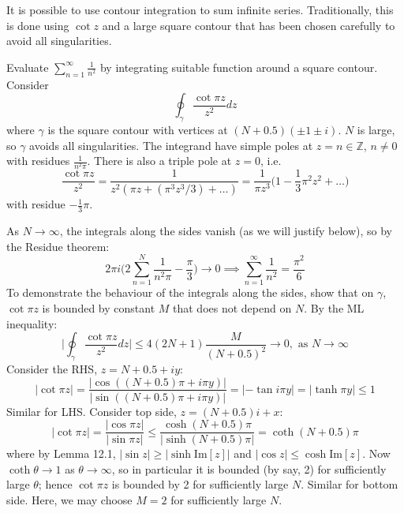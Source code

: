 \documentclass[a4paper]{article}
\begin{document}
It is possible to use contour integration to sum infinite series. Traditionally, this is done using $\cot z$ and a large square contour that has been chosen carefully to avoid all singularities. 
\begin{eg}
Evaluate $\sum_{n=1}^\infty\frac{1}{n^2}$ by integrating suitable function around a square contour. Consider
$$\oint_\gamma\frac{\cot\pi z}{z^2}dz$$
where $\gamma$ is the square contour with vertices at $(N+0.5)(\pm1\pm i)$. $N$ is large, so $\gamma$ avoids all singularities. The integrand have simple poles at $z=n\in\mathbb{Z}$, $n\neq0$ with residues $\frac{1}{n^2\pi}$. There is also a triple pole at $z=0$, i.e.
$$\frac{\cot \pi z}{z^2}=\frac{1}{z^2(\pi z+(\pi^3z^3/3)+\dots)}=\frac{1}{\pi z^3}\bigg(1-\frac{1}{3}\pi^2z^2+\dots\bigg)$$
with residue $-\frac{1}{3}\pi$. 
\begin{center}
  \end{center}

As $N\rightarrow\infty$, the integrals along the sides vanish (as we will justify below), so by the Residue theorem:
$$2\pi i\bigg(2\sum_{n=1}^N\frac{1}{n^2\pi}-\frac{\pi}{3}\bigg)\rightarrow 0\implies\sum_{n=1}^\infty\frac{1}{n^2}=\frac{\pi^2}{6}$$
To demonstrate the behaviour of the integrals along the sides, show that on $\gamma$, $\cot\pi z$ is bounded by constant $M$ that does not depend on $N$. By the ML inequality:
$$\bigg|\oint_{\gamma}\frac{\cot\pi z}{z^2}dz\bigg|\leq4(2N+1)\frac{M}{(N+0.5)^2}\rightarrow 0,\text{ as }N\rightarrow\infty$$
Consider the RHS, $z=N+0.5+iy$:
$$|\cot\pi z|=\frac{|\cos((N+0.5)\pi+i\pi y)|}{|\sin((N+0.5)\pi+i\pi y)|}=|-\tan i\pi y|=|\tanh\pi y|\leq1$$
Similar for LHS. Consider top side, $z=(N+0.5)i+x$:
$$|\cot\pi z|=\frac{|\cos\pi z|}{|\sin\pi z|}\leq\frac{\cosh(N+0.5)\pi}{|\sinh(N+0.5)\pi|}=\coth(N+0.5)\pi$$
where by Lemma 12.1, $|\sin z|\geq|\sinh\text{Im}[z]|$ and $|\cos z|\leq\cosh\text{Im}[z]$. Now $\coth\theta\rightarrow 1$ as $\theta\rightarrow\infty$, so in particular it is bounded (by say, 2) for sufficiently large $\theta$; hence $\cot\pi z$ is bounded by 2 for sufficiently large $N$. Similar for bottom side. Here, we may choose $M=2$ for sufficiently large $N$.
\end{eg}
\newpage
\end{document}
